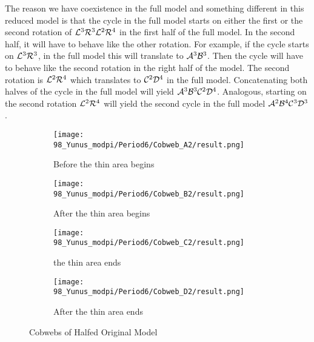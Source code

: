 The reason we have coexistence in the full model and something different in this reduced model is that the cycle in the full model starts on either the first or the second rotation of $\mathcal{L}^3\mathcal{R}^3\mathcal{L}^2\mathcal{R}^4$ in the first half of the full model.
In the second half, it will have to behave like the other rotation.
For example, if the cycle starts on $\mathcal{L}^3\mathcal{R}^3$, in the full model this will translate to $\mathcal{A}^3\mathcal{B}^3$.
Then the cycle will have to behave like the second rotation in the right half of the model.
The second rotation is $\mathcal{L}^2\mathcal{R}^4$ which translates to $\mathcal{C}^2\mathcal{D}^4$ in the full model.
Concatenating both halves of the cycle in the full model will yield $\mathcal{A}^3\mathcal{B}^3\mathcal{C}^2\mathcal{D}^4$.
Analogous, starting on the second rotation $\mathcal{L}^2\mathcal{R}^4$ will yield the second cycle in the full model $\mathcal{A}^2\mathcal{B}^4\mathcal{C}^3\mathcal{D}^3$.

\begin{figure}
    \centering
    \begin{subfigure}{0.4\textwidth}
        \centering
        \texttt{[image: 98\_Yunus\_modpi/Period6/Cobweb\_A2/result.png]}
        \caption{Before the thin area begins}
        \label{fig:yunus.pi.CobwebA2}
    \end{subfigure}
    \begin{subfigure}{0.4\textwidth}
        \centering
        \texttt{[image: 98\_Yunus\_modpi/Period6/Cobweb\_B2/result.png]}
        \caption{After the thin area begins}
        \label{fig:yunus.pi.CobwebB2}
    \end{subfigure}
    \begin{subfigure}{0.4\textwidth}
        \centering
        \texttt{[image: 98\_Yunus\_modpi/Period6/Cobweb\_C2/result.png]}
        \caption{the thin area ends}
        \label{fig:yunus.pi.CobwebC2}
    \end{subfigure}
    \begin{subfigure}{0.4\textwidth}
        \centering
        \texttt{[image: 98\_Yunus\_modpi/Period6/Cobweb\_D2/result.png]}
        \caption{After the thin area ends}
        \label{fig:yunus.pi.CobwebD2}
    \end{subfigure}
    \caption{Cobwebs of Halfed Original Model}
\end{figure}
